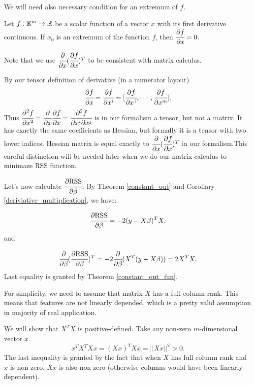 \documentclass[main.tex]{subfiles}
\begin{document}
We will need also necessary condition for an extremum of $f$.

\begin{theorem}
\label{local_minimum_necessary}
Let $f:\mathbb{R}^m \to \mathbb{R}$ be a scalar function of a vector $x$ with its first derivative continuous.
If $x_0$ is an extremum of the function $f$, then $\cfrac{\partial f}{\partial x} = 0$.
\end{theorem}
Note that we use $\cfrac{\partial}{\partial x}(\cfrac{\partial f}{\partial x})^T$ to be consistent with matrix calculus. 

By our tensor definition of derivative (in a numerator layout)
$$
\cfrac{\partial f}{\partial x} = 
 \cfrac{\partial f}{\partial x^i} = [\cfrac{\partial f}{\partial x^1}, \cdots, \cfrac{\partial f}{\partial x^m}].
$$
Thus $\cfrac{\partial^2 f}{\partial x^2} = \cfrac{\partial}{\partial x} \cfrac{\partial f}{\partial x} = \cfrac{\partial^2 f}{\partial x^i \partial x^j}$ is in our formalism a tensor, but not a matrix. It has exactly the same coefficients as Hessian, but formally it is a tensor with two lower indices. Hessian matrix is equal exactly to $\cfrac{\partial}{\partial x}(\cfrac{\partial f}{\partial x})^T$ in our formalism.This careful distinction will be needed later when we do our matrix calculus to minimaze RSS function.

Let's now calculate $\cfrac{\partial \text{RSS}}{\partial \beta}$. By Theorem \ref{constant_out} and Corollary \ref{deriviative_multiplication}, we have:

\begin{equation}
    \cfrac{\partial \text{RSS}}{\partial \beta} =  - 2(y - X\beta)^T X.
\end{equation}
and

\begin{equation}
     \cfrac{\partial}{\partial \beta}(\cfrac{\partial \text{RSS}}{\partial \beta})^T
     = -2 \cfrac{\partial}{\partial \beta} (X^T (y - X\beta))
     = 2X^T X.
\end{equation}
Last equality is granted by Theorem \ref{constant_out_fun}.

For simplicity, we need to assume that matrix $X$ has a full column rank. This means that features are not linearly depended, which is a pretty valid assumption in majority of real application.

We will show that $X^T X$ is positive-defined. Take any non-zero $m$-dimensional vector $x$.
\begin{equation}
    x^T X^T X x = (Xx)^T Xx = ||Xx||^2 > 0.
\end{equation}
The last inequality is granted by the fact that when $X$ has full column rank and $x$ is non-zero, $Xx$ is also non-zero (otherwise columns would have been linearly dependent).
\end{document}
